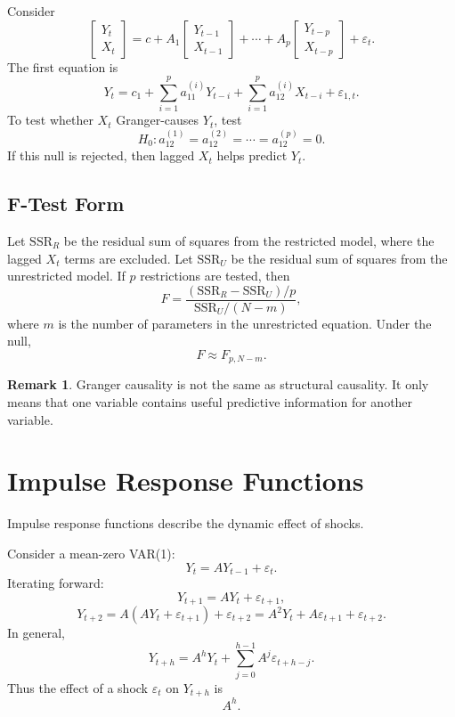 \documentclass[12pt,oneside]{book}
\numberwithin{equation}{section}
\theoremstyle{definition}
\newtheorem{remark}{Remark}[section]
\theoremstyle{plain}
\theoremstyle{remark}
\begin{document}
Consider
\[
\begin{bmatrix}
Y_t\\
X_t
\end{bmatrix}
=
c
+
A_1
\begin{bmatrix}
Y_{t-1}\\
X_{t-1}
\end{bmatrix}
+
\cdots
+
A_p
\begin{bmatrix}
Y_{t-p}\\
X_{t-p}
\end{bmatrix}
+
\varepsilon_t.
\]
The first equation is
\[
Y_t
=
c_1
+
\sum_{i=1}^p a_{11}^{(i)}Y_{t-i}
+
\sum_{i=1}^p a_{12}^{(i)}X_{t-i}
+
\varepsilon_{1,t}.
\]
To test whether $X_t$ Granger-causes $Y_t$, test
\[
H_0:
a_{12}^{(1)}=a_{12}^{(2)}=\cdots=a_{12}^{(p)}=0.
\]
If this null is rejected, then lagged $X_t$ helps predict $Y_t$.

\subsection{F-Test Form}

Let $\mathrm{SSR}_R$ be the residual sum of squares from the restricted model, where the lagged $X_t$ terms are excluded. Let $\mathrm{SSR}_U$ be the residual sum of squares from the unrestricted model. If $p$ restrictions are tested, then
\[
F
=
\frac{(\mathrm{SSR}_R-\mathrm{SSR}_U)/p}
{\mathrm{SSR}_U/(N-m)},
\]
where $m$ is the number of parameters in the unrestricted equation. Under the null,
\[
F\approx F_{p,N-m}.
\]

\begin{remark}
Granger causality is not the same as structural causality. It only means that one variable contains useful predictive information for another variable.
\end{remark}

\section{Impulse Response Functions}

Impulse response functions describe the dynamic effect of shocks.

Consider a mean-zero VAR(1):
\[
Y_t=AY_{t-1}+\varepsilon_t.
\]
Iterating forward:
\[
Y_{t+1}=AY_t+\varepsilon_{t+1},
\]
\[
Y_{t+2}=A(AY_t+\varepsilon_{t+1})+\varepsilon_{t+2}
=
A^2Y_t+A\varepsilon_{t+1}+\varepsilon_{t+2}.
\]
In general,
\[
Y_{t+h}
=
A^hY_t+\sum_{j=0}^{h-1}A^j\varepsilon_{t+h-j}.
\]
Thus the effect of a shock $\varepsilon_t$ on $Y_{t+h}$ is
\[
A^h.
\]
\end{document}
